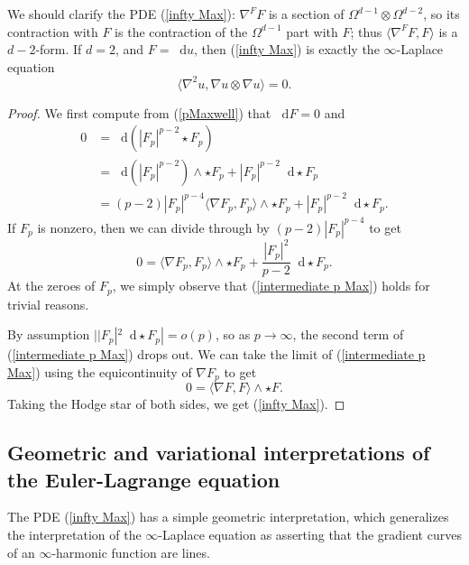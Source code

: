 \documentclass[reqno,11pt]{amsart}
\newcommand*\dif{\mathop{}\!\mathrm{d}}
\theoremstyle{definition}
\numberwithin{equation}{section}
\begin{document}
We should clarify the PDE (\ref{infty Max}): $\nabla^F F$ is a section of $\Omega^{d - 1} \otimes \Omega^{d - 2}$, so its contraction with $F$ is the contraction of the $\Omega^{d - 1}$ part with $F$; thus $\langle \nabla^F F, F\rangle$ is a $d - 2$-form.
If $d = 2$, and $F = \dif u$, then (\ref{infty Max}) is exactly the $\infty$-Laplace equation 
$$\langle\nabla^2 u, \nabla u \otimes \nabla u\rangle = 0.$$

\begin{proof}
We first compute from (\ref{pMaxwell}) that $\dif F = 0$ and
\begin{align*}
0
&= \dif(|F_p|^{p - 2} \star F_p) \\
&= \dif(|F_p|^{p - 2}) \wedge \star F_p + |F_p|^{p - 2} \dif \star F_p \\
&= (p - 2) |F_p|^{p - 4} \langle \nabla F_p, F_p\rangle \wedge \star F_p + |F_p|^{p - 2} \dif \star F_p.
\end{align*}
If $F_p$ is nonzero, then we can divide through by $(p - 2) |F_p|^{p - 4}$ to get
\begin{equation}\label{intermediate p Max}
0 = \langle\nabla F_p, F_p\rangle \wedge \star F_p + \frac{|F_p|^2}{p - 2} \dif \star F_p.
\end{equation}
At the zeroes of $F_p$, we simply observe that (\ref{intermediate p Max}) holds for trivial reasons.

By assumption $||F_p|^2 \dif \star F_p| = o(p)$, so as $p \to \infty$, the second term of (\ref{intermediate p Max}) drops out.
We can take the limit of (\ref{intermediate p Max}) using the equicontinuity of $\nabla F_p$ to get
$$0 = \langle \nabla F, F \rangle \wedge \star F.$$
Taking the Hodge star of both sides, we get (\ref{infty Max}).
\end{proof}

\subsection{Geometric and variational interpretations of the Euler-Lagrange equation}
The PDE (\ref{infty Max}) has a simple geometric interpretation, which generalizes the interpretation of the $\infty$-Laplace equation as asserting that the gradient curves of an $\infty$-harmonic function are lines.
\end{document}
